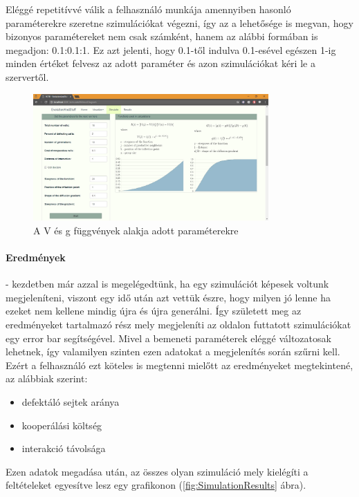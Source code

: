 Eléggé repetitívvé válik a felhasználó munkája amennyiben hasonló paraméterekre szeretne szimulációkat végezni, így az a lehetősége is megvan, hogy bizonyos paramétereket nem csak számként, hanem az alábbi formában is megadjon: 0.1:0.1:1. Ez azt jelenti, hogy 0.1-től indulva 0.1-esével egészen 1-ig minden értéket felvesz az adott paraméter és azon szimulációkat kéri le a szervertől.

\begin{figure}[ht!]
	\centering
	\includegraphics[width=90mm]{images/SimulationFunctionDiagrams}
	\vspace*{1mm}
	\caption{A V és g függvények alakja adott paraméterekre}
	\label{fig:SimulationFunctionDiagrams}
\end{figure}


\paragraph{Eredmények}- kezdetben már azzal is megelégedtünk, ha egy szimulációt képesek voltunk megjeleníteni, viszont egy idő után azt vettük észre, hogy milyen jó lenne ha ezeket nem kellene mindig újra és újra generálni. Így született meg az eredményeket tartalmazó rész mely megjeleníti az oldalon futtatott szimulációkat egy error bar segítségével. Mivel a bemeneti paraméterek eléggé változatosak lehetnek, így valamilyen szinten ezen adatokat a megjelenítés során szűrni kell. Ezért a felhasználó ezt köteles is megtenni mielőtt az eredményeket megtekintené, az alábbiak szerint:
\begin{itemize}
	\item defektáló sejtek aránya
	\item kooperálási költség 
	\item interakció távolsága
\end{itemize}
Ezen adatok megadása után, az összes olyan szimuláció mely kielégíti a feltételeket egyesítve lesz egy grafikonon (\ref{fig:SimulationResults} ábra).

